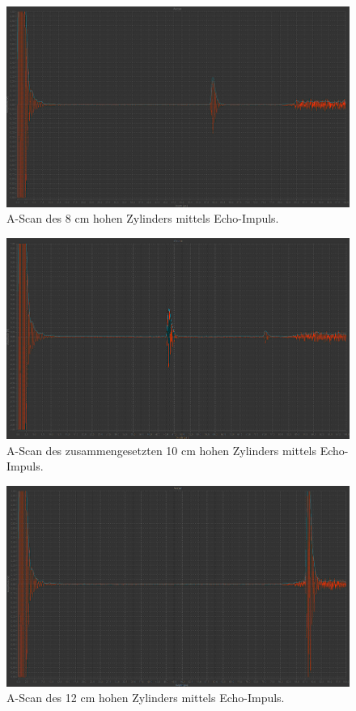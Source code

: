    \begin{figure}
        \centering
        \includegraphics[width=15cm]{messwerte/Impuls-Echo/8_ImEc.png}
        \caption{A-Scan des 8 cm hohen Zylinders mittels Echo-Impuls.}
    \end{figure}

    \begin{figure}
        \centering
        \includegraphics[width=15cm]{messwerte/Impuls-Echo/10_ImEc.png}
        \caption{A-Scan des zusammengesetzten 10 cm hohen Zylinders mittels Echo-Impuls.}
    \end{figure}

    \begin{figure}
        \centering
        \includegraphics[width=15cm]{messwerte/Impuls-Echo/12_ImEc.png}
        \caption{A-Scan des 12 cm hohen Zylinders mittels Echo-Impuls.}
    \end{figure}

